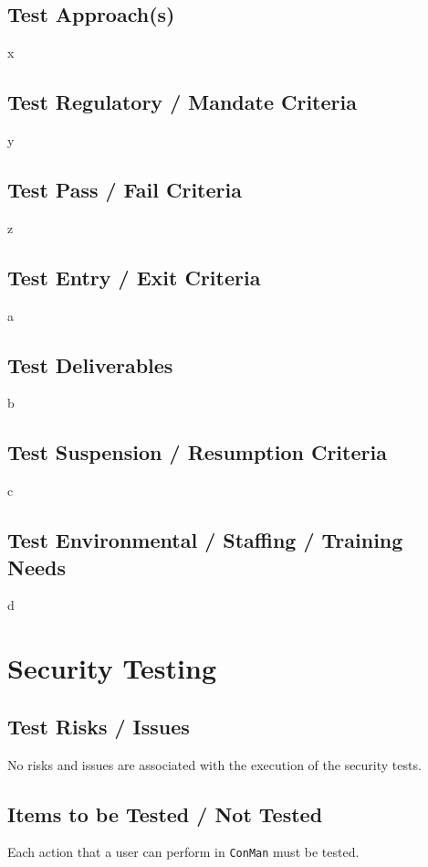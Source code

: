 \documentclass{article}
\begin{document}
\subsection{Test Approach(s)}
x

\subsection{Test Regulatory / Mandate Criteria}
y

\subsection{Test Pass / Fail Criteria}
z

\subsection{Test Entry / Exit Criteria}
a

\subsection{Test Deliverables}
b

\subsection{Test Suspension / Resumption Criteria}
c

\subsection{Test Environmental / Staffing / Training Needs}
d

\newpage
\section{Security Testing}
\subsection{Test Risks / Issues}
No risks and issues are associated with the execution of the security tests.

\subsection{Items to be Tested / Not Tested}
Each action that a user can perform in \texttt{ConMan} must be tested.\newline
\end{document}
